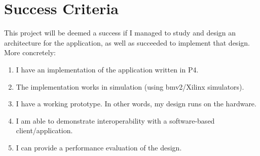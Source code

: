 \section*{\fontsize{18pt}{1}\selectfont Success Criteria}

This project will be deemed a success if I managed to study and design an architecture for the application, as well as succeeded to implement that design. More concretely:

\begin{enumerate}
	\item I have an implementation of the application written in P4.
	
	\item The implementation works in simulation (using bmv2/Xilinx simulators).
	
	\item I have a working prototype. In other words, my design runs on the hardware.
	
	\item I am able to demonstrate interoperability with a software-based client/application.
	
	\item I can provide a performance evaluation of the design.
\end{enumerate}